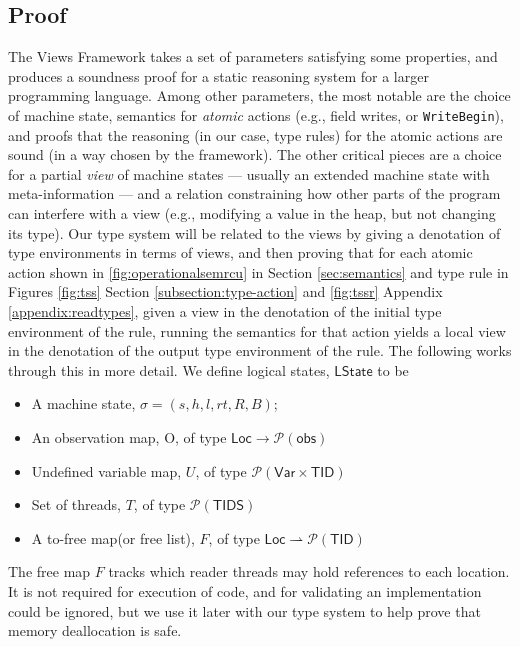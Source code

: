 \subsection{Proof}
\label{sec:proof}
The Views Framework takes a set of parameters satisfying some properties, and produces a soundness proof for a static reasoning system for a larger programming language.  Among other parameters, the most notable are the choice of machine state, semantics for \emph{atomic} actions (e.g., field writes, or \lstinline|WriteBegin|), and proofs that the reasoning (in our case, type rules) for the atomic actions are sound (in a way chosen by the framework).
The other critical pieces are a choice for a partial \emph{view} of machine states --- usually an extended machine state with meta-information --- and a relation constraining how other parts of the program can interfere with a view (e.g., modifying a value in the heap, but not changing its type).
Our type system will be related to the views by giving a denotation of type environments in terms of views, and then proving that for each atomic action shown in \ref{fig:operationalsemrcu} in Section \ref{sec:semantics} and type rule in Figures \ref{fig:tss} Section \ref{subsection:type-action} and \ref{fig:tssr} Appendix \ref{appendix:readtypes}, given a view in the denotation of the initial type environment of the rule, running the semantics for that action yields a local view in the denotation of the output type environment of the rule.  The following works through this in more detail. We define logical states, $\textsf{LState}$ to be
\begin{itemize}
\item A machine state, $\sigma=(s,h,l,rt,R,B)$;
\item An observation map, O, of type $ \textsf{Loc} \to \mathcal{P}(\textsf{obs})$
\item Undefined variable map, $U$, of type $\mathcal{P}(\textsf{Var}\times \textsf{TID})$
\item Set of threads, $T$, of type $\mathcal{P}(\textsf{TIDS})$
\item A to-free map(or free list), $F$, of type $\textsf{Loc} \rightharpoonup \mathcal{P}(\textsf{TID})$
\end{itemize}
The free map $F$ tracks which reader threads may hold references to each location. It is not required for execution of code, and for validating an implementation could be ignored, but we use it later with our type system to help prove that memory deallocation is safe.

